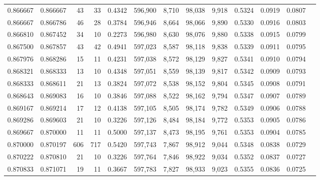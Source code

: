 \begin{tabular}{rrrrrrrrrrrrr}
0.866667 & 0.866667 &    43 &  33 &                                     0.4342 & 596,900 &   8,710 &  98,038 &   9,918 & 0.5324 & 0.0919 & 0.0807 \\
0.866667 & 0.866786 &    46 &  28 &                                     0.3784 & 596,946 &   8,664 &  98,066 &   9,890 & 0.5330 & 0.0916 & 0.0803 \\
0.866810 & 0.867452 &    34 &  10 &                                     0.2273 & 596,980 &   8,630 &  98,076 &   9,880 & 0.5338 & 0.0915 & 0.0799 \\
0.867500 & 0.867857 &    43 &  42 &                                     0.4941 & 597,023 &   8,587 &  98,118 &   9,838 & 0.5339 & 0.0911 & 0.0795 \\
0.867976 & 0.868286 &    15 &  11 &                                     0.4231 & 597,038 &   8,572 &  98,129 &   9,827 & 0.5341 & 0.0910 & 0.0794 \\
0.868321 & 0.868333 &    13 &  10 &                                     0.4348 & 597,051 &   8,559 &  98,139 &   9,817 & 0.5342 & 0.0909 & 0.0793 \\
0.868333 & 0.868611 &    21 &  13 &                                     0.3824 & 597,072 &   8,538 &  98,152 &   9,804 & 0.5345 & 0.0908 & 0.0791 \\
0.868643 & 0.869083 &    16 &  10 &                                     0.3846 & 597,088 &   8,522 &  98,162 &   9,794 & 0.5347 & 0.0907 & 0.0789 \\
0.869167 & 0.869214 &    17 &  12 &                                     0.4138 & 597,105 &   8,505 &  98,174 &   9,782 & 0.5349 & 0.0906 & 0.0788 \\
0.869286 & 0.869603 &    21 &  10 &                                     0.3226 & 597,126 &   8,484 &  98,184 &   9,772 & 0.5353 & 0.0905 & 0.0786 \\
0.869667 & 0.870000 &    11 &  11 &                                     0.5000 & 597,137 &   8,473 &  98,195 &   9,761 & 0.5353 & 0.0904 & 0.0785 \\
0.870000 & 0.870197 &   606 & 717 &                                     0.5420 & 597,743 &   7,867 &  98,912 &   9,044 & 0.5348 & 0.0838 & 0.0729 \\
0.870222 & 0.870810 &    21 &  10 &                                     0.3226 & 597,764 &   7,846 &  98,922 &   9,034 & 0.5352 & 0.0837 & 0.0727 \\
0.870833 & 0.871071 &    19 &  11 &                                     0.3667 & 597,783 &   7,827 &  98,933 &   9,023 & 0.5355 & 0.0836 & 0.0725 \\

\end{tabular}
